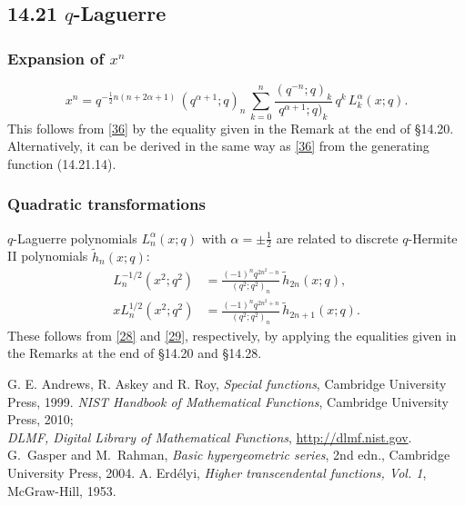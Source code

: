 \documentclass[twoside,11pt]{article}
\newcommand\al\alpha
\newcommand\half{\frac12}
\newcommand\wt{\widetilde}
\begin{document}
\subsection*{14.21 $q$-Laguerre}
%
\subsubsection*{Expansion of $x^n$}
\begin{equation}
x^n=q^{-\half n(n+2\al+1)}\,(q^{\al+1};q)_n\,
\sum_{k=0}^n\frac{(q^{-n};q)_k}{q^{\al+1};q)_k}\,q^k\,L_k^\al(x;q).
\label{37}
\end{equation}
This follows from \eqref{36} by the equality given in the Remark at the end
of \S14.20. Alternatively, it can be derived in the same way as \eqref{36}
from the generating function (14.21.14).
%
\subsubsection*{Quadratic transformations}
$q$-Laguerre polynomials $L_n^\al(x;q)$ with $\al=\pm\half$ are
related to discrete $q$-Hermite II polynomials $\wt h_n(x;q)$:
\begin{align}
L_n^{-1/2}(x^2;q^2)&=
\frac{(-1)^n q^{2n^2-n}}{(q^2;q^2)_n}\,\wt h_{2n}(x;q),
\label{38}\\
xL_n^{1/2}(x^2;q^2)&=
\frac{(-1)^n q^{2n^2+n}}{(q^2;q^2)_n}\,\wt h_{2n+1}(x;q).
\label{39}
\end{align}
These follows from \eqref{28} and \eqref{29}, respectively, by applying
the equalities given in the Remarks at the end of \S14.20 and \S14.28.
%
\renewcommand{\refname}{Standard references}
\begin{thebibliography}{9999999}
%
G. E. Andrews, R. Askey and R. Roy,
{\em Special functions},
Cambridge University Press, 1999.
%
{\em NIST Handbook of Mathematical Functions},
Cambridge University Press, 2010;\\
{\em DLMF, Digital Library of Mathematical Functions},
\url{http://dlmf.nist.gov}.
%
G.~Gasper and M.~Rahman,
{\em Basic hypergeometric series}, 2nd edn.,
Cambridge University Press, 2004.
%
A. Erd\'elyi,
{\em Higher transcendental functions, Vol. 1},
McGraw-Hill, 1953.
%
\end{thebibliography}
%
\renewcommand{\refname}{References from Koekoek, Lesky \& Swarttouw}
\end{document}
